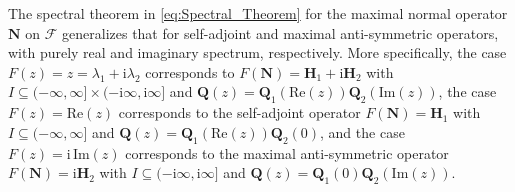 \documentclass[11pt]{amsart}
\newcommand{\I}{\mathrm{i}}
\newcommand{\Hb}{\mathbf{H}}
\newcommand{\Qb}{\mathbf{Q}}
\newcommand{\Nb}{\mathbf{N}}
\newcommand{\Fs}{\mathscr{F}}
\begin{document}
The spectral theorem in \eqref{eq:Spectral_Theorem} for the maximal
normal operator $\Nb$ on $\Fs$ 
generalizes that for self-adjoint and maximal anti-symmetric
operators, with purely real and imaginary spectrum, respectively. More
specifically, the case $F(z)=z=\lambda_1+\I\lambda_2$ corresponds to
$F(\Nb)=\Hb_1+\I\Hb_2$ with $I\subseteq(-\infty,\infty]\times(-\I\infty,\I\infty]$ and
$\Qb(z)=\Qb_1(\text{Re}(z))\Qb_2(\text{Im}(z))$, the case
$F(z)=\text{Re}(z)$ corresponds to the self-adjoint operator
$F(\Nb)=\Hb_1$ with $I\subseteq(-\infty,\infty]$ and $\Qb(z)=\Qb_1(\text{Re}(z))\Qb_2(0)$, and
the case $F(z)=\I\,\text{Im}(z)$ corresponds to the maximal
anti-symmetric operator $F(\Nb)=\I\Hb_2$ with $I\subseteq(-\I\infty,\I\infty]$ and 
$\Qb(z)=\Qb_1(0)\Qb_2(\text{Im}(z))$. 
\end{document}
